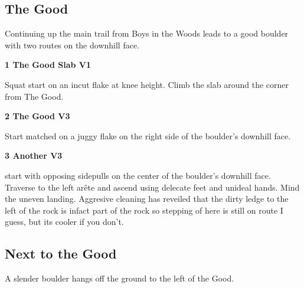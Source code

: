 	\begin{multicols}{2}


\needspace{1.5cm}
\subsection*{The Good}\label{bf:The Good}
Continuing up the main trail from Boys in the Woods leads to a good boulder with two routes on the downhill face.\\
	


\needspace{1.5cm}
\label{rt:The Good Slab}
\colorbox{green!20}{
\parbox{0.95\linewidth}{
\textbf{
1 The Good Slab V1  
}}}

\begin{adjustwidth}{0.5cm}{}			
Squat start on an incut flake at knee height. Climb the slab around the corner from The Good.
\end{adjustwidth}



\needspace{1.5cm}
\label{rt:The Good}
\colorbox{green!20}{
\parbox{0.95\linewidth}{
\textbf{
2 The Good V3  
}}}

\begin{adjustwidth}{0.5cm}{}			
Start matched on a juggy flake on the right side of the boulder's downhill face.
\end{adjustwidth}



\needspace{1.5cm}
\label{rt:Another}
\colorbox{green!20}{
\parbox{0.95\linewidth}{
\textbf{
3 Another V3  \warn
}}}

\begin{adjustwidth}{0.5cm}{}			
start with opposing sidepulls on the center of the boulder's downhill face. Traverse to the left arête and ascend using delecate feet and unideal hands. Mind the uneven landing. Aggresive cleaning has reveiled that the dirty ledge to the left of the rock is infact part of the rock so stepping of here is still on route I guess, but its cooler if you don't.
\end{adjustwidth}




\needspace{1.5cm}
\subsection*{Next to the Good}\label{bf:Next to the Good}
A slender boulder hangs off the ground to the left of the Good.\\
	



\end{multicols}
